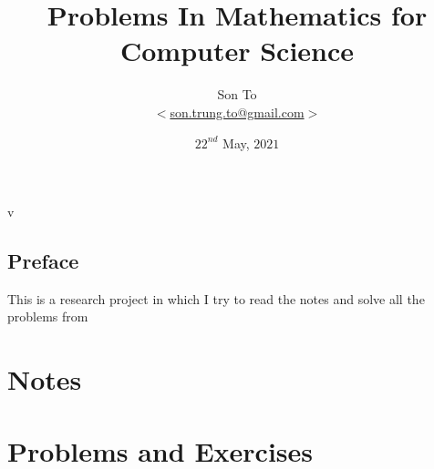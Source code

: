 \documentclass[a4paper,11pt]{memoir}
\newcommand{\fileVer}{}
\theoremstyle{plain} \newtheorem{lemNotes}{Lemma}[chapter]
\theoremstyle{definition} \newtheorem{pr}{Problem}[chapter]
\theoremstyle{remark}     \newtheorem{ab}{Remark}[chapter]
\theoremstyle{plain} \newtheorem{lemPr}{Lemma}[pr]
\begin{document}
    
    \title{Problems In Mathematics for Computer Science}
    \author{Son To\\
    $<$\href{mailto:son.trung.to@gmail.com}%
    {son.trung.to@gmail.com}$>$}
    \date{$22^{nd}$ May, $2021$}

    \maketitle
    \makeatletter
    \thispagestyle{empty}
    \begin{center}
        v\fileVer
    \end{center}
    \def\cleardoublepage{\clearpage\if@twoside
        \ifodd\c@page\else
            \hbox{}
            \vspace*{\fill}
            \begin{center}
                \doublenote
            \end{center}
            \vspace*{\fill}
            \thispagestyle{empty}
            \newpage
            \if@twocolumn\hbox{}\newpage\fi
        \fi
    \fi
    }
    \newcommand{\mylabel}[2]{#2\def\@currentlabel{#2}\label{#1}}
    \def\@endpart{\vfill\newpage
        \if@twoside
            \if@openright
                \null
                \thispagestyle{empty}
                \vspace*{\fill}
                \begin{quote}
                    \partnote
                \end{quote}
                \vspace*{\fill}
                \newpage
            \fi
        \fi
        \if@tempswa
            \twocolumn
        \fi
    }
    \newcommand{\partnote}{}
    \newcommand{\doublenote}{}
    \makeatother
    \frontmatter
        \chapter{Preface}
            This is a research project in which I try to read
            the notes and solve all the problems
            from \cite{lehman2018}
        \clearpage
        \tableofcontents

    \mainmatter
    \part{Notes}
        
        
    \part{Problems and Exercises}
        
        

    
    
\end{document}
